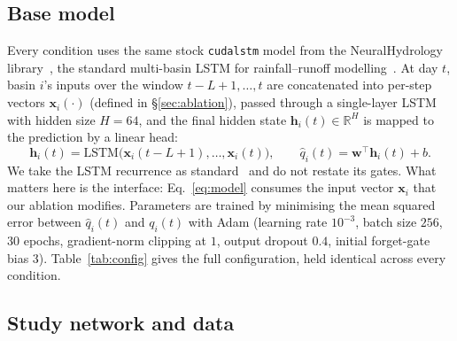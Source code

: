 \documentclass[11pt]{article}
\begin{document}
\subsection{Base model}
\label{sec:model}

Every condition uses the same stock \texttt{cudalstm} model from the NeuralHydrology
library~\cite{kratzert2022joss}, the standard multi-basin LSTM for rainfall--runoff
modelling~\cite{kratzert2018,kratzert2019}. At day $t$, basin $i$'s inputs over the window
$t\!-\!L\!+\!1,\dots,t$ are concatenated into per-step vectors $\mathbf{x}_i(\cdot)$
(defined in \S\ref{sec:ablation}), passed through a single-layer LSTM with hidden size $H=64$, and
the final hidden state $\mathbf{h}_i(t)\in\mathbb{R}^{H}$ is mapped to the prediction by a linear head:
\begin{equation}
\label{eq:model}
\mathbf{h}_i(t) = \mathrm{LSTM}\!\big(\mathbf{x}_i(t\!-\!L\!+\!1),\dots,\mathbf{x}_i(t)\big),
\qquad
\hat{q}_i(t) = \mathbf{w}^\top \mathbf{h}_i(t) + b .
\end{equation}
We take the LSTM recurrence as standard~\cite{kratzert2018} and do not restate its gates. What
matters here is the interface: Eq.~\eqref{eq:model} consumes the input vector $\mathbf{x}_i$ that
our ablation modifies. Parameters are trained by minimising the mean squared error between
$\hat{q}_i(t)$ and $q_i(t)$ with Adam (learning rate $10^{-3}$, batch size $256$, $30$ epochs,
gradient-norm clipping at $1$, output dropout $0.4$, initial forget-gate bias $3$). Table~\ref{tab:config}
gives the full configuration, held identical across every condition.

\subsection{Study network and data}
\label{sec:network}
\end{document}
